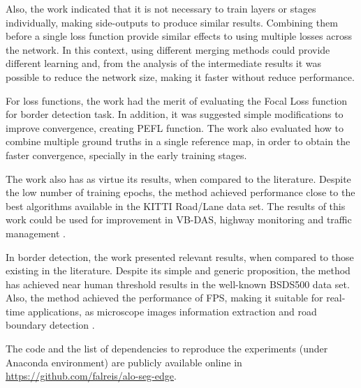 Also, the work indicated that it is not necessary to train layers or stages individually, making side-outputs to produce similar results.
Combining them before a single loss function provide similar effects to using multiple losses across the network.
In this context, using different merging methods could provide different learning and, from the analysis of the intermediate results it was possible to reduce the network size, making it faster without reduce performance.

For loss functions, the work had the merit of evaluating the Focal Loss \cite{Lin:2017} function for border detection task.
In addition, it was suggested simple modifications to improve convergence, creating PEFL function.
The work also evaluated how to combine multiple ground truths in a single reference map, in order to obtain the faster convergence, specially in the early training stages.

The work also has as virtue its results, when compared to the literature.
Despite the low number of training epochs, the method achieved performance close to the best algorithms available in the KITTI Road/Lane data set.
The results of this work could be used for improvement in VB-DAS, highway monitoring and traffic management \cite{Reis:2019}.

In border detection, the work presented relevant results, when compared to those existing in the literature.
Despite its simple and generic proposition, the method has achieved near human threshold results in the well-known BSDS500 data set.
Also, the method achieved the performance of \myFPS FPS, making it suitable for real-time applications, as microscope images information extraction and road boundary detection \cite{Qu:2020} \cite{Li:2020} \cite{Perng:2020}.


The code and the list of dependencies to reproduce the experiments (under Anaconda environment) are publicly available online in \url{https://github.com/falreis/alo-seg-edge}.

